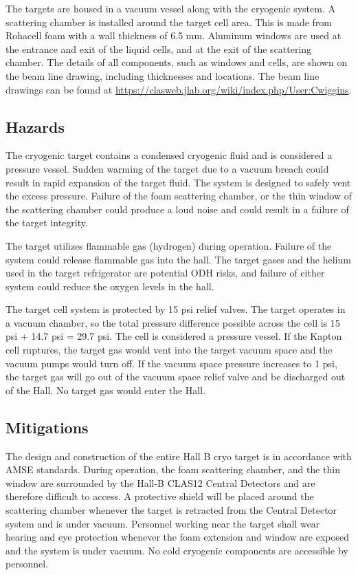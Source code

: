 The targets are housed in a vacuum vessel along with the cryogenic system. A scattering chamber is installed around the target cell area. This is made from Rohacell foam with a wall thickness of 6.5 mm.  Aluminum windows are used at the entrance and exit of the liquid cells, and at the exit of the scattering chamber.  The details of all components, such as windows and cells, are shown on the beam line drawing, including thicknesses and locations. The beam line drawings can be found at \href{https://clasweb.jlab.org/wiki/index.php/User:Cwiggins}{https://clasweb.jlab.org/wiki/index.php/User:Cwiggins}.

\subsection{Hazards} 

The cryogenic target contains a condensed cryogenic fluid and is considered a pressure vessel. Sudden warming of the target due to a vacuum breach could result in rapid expansion of the target fluid. The system is designed to safely vent the excess pressure. Failure of the foam scattering chamber, or the thin window of the scattering chamber could produce a loud noise and could result in a failure of the target integrity.

The target utilizes flammable gas (hydrogen) during operation. Failure of the system could release flammable gas into the hall. The target gases and the helium used in the target refrigerator are potential ODH risks, and failure of either system could reduce the oxygen levels in the hall.

The target cell system is protected by 15 psi relief valves.  The target operates in a vacuum chamber, so the total pressure difference possible across the cell is 15 psi + 14.7 psi = 29.7 psi. The cell is considered a pressure vessel. If the Kapton cell ruptures, the target gas would vent into the target vacuum space and the vacuum pumps would turn off. If the vacuum space pressure increases to 1 psi, the target gas will go out of the vacuum space relief valve and be discharged out of the Hall. No target gas would enter the Hall.

\subsection{Mitigations}

The design and construction of the entire Hall B cryo target is in accordance with AMSE standards. During operation, the foam scattering chamber, and the thin window are surrounded by the Hall-B CLAS12 Central Detectors and are therefore difficult to access. A protective shield will be placed around the scattering chamber whenever the target is retracted from the Central Detector system and is under vacuum.  Personnel working near the target shall wear hearing and eye protection whenever the foam extension and window are exposed and the system is under vacuum. No cold cryogenic components are accessible by personnel.

